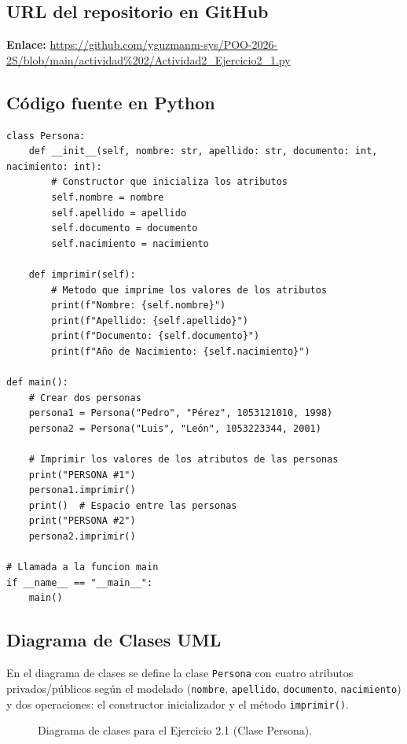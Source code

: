 \documentclass[11pt,a4paper]{article}
\newcommand{\umlm}{$-$\,}
\newcommand{\umlp}{$+$\,}
\begin{document}
\subsection{URL del repositorio en GitHub}
\noindent \textbf{Enlace:} \url{https://github.com/yguzmanm-sys/POO-2026-2S/blob/main/actividad%202/Actividad2_Ejercicio2_1.py}

\subsection{Código fuente en Python}
\begin{lstlisting}[caption={Implementación de la clase Persona (\texttt{Actividad2\_Ejercicio2\_1.py})}]
class Persona:
    def __init__(self, nombre: str, apellido: str, documento: int, nacimiento: int):
        # Constructor que inicializa los atributos
        self.nombre = nombre
        self.apellido = apellido
        self.documento = documento
        self.nacimiento = nacimiento

    def imprimir(self):
        # Metodo que imprime los valores de los atributos
        print(f"Nombre: {self.nombre}")
        print(f"Apellido: {self.apellido}")
        print(f"Documento: {self.documento}")
        print(f"Año de Nacimiento: {self.nacimiento}")

def main():
    # Crear dos personas
    persona1 = Persona("Pedro", "Pérez", 1053121010, 1998)
    persona2 = Persona("Luis", "León", 1053223344, 2001)

    # Imprimir los valores de los atributos de las personas
    print("PERSONA #1")
    persona1.imprimir()
    print()  # Espacio entre las personas
    print("PERSONA #2")
    persona2.imprimir()

# Llamada a la funcion main
if __name__ == "__main__":
    main()
\end{lstlisting}

\subsection{Diagrama de Clases UML}
En el diagrama de clases se define la clase \texttt{Persona} con cuatro atributos privados/públicos según el modelado (\texttt{nombre}, \texttt{apellido}, \texttt{documento}, \texttt{nacimiento}) y dos operaciones: el constructor inicializador y el método \texttt{imprimir()}.

\begin{figure}[H]
    \centering
    \caption{Diagrama de clases para el Ejercicio 2.1 (Clase Persona).}
    \label{fig:uml_ej2_1}
\end{figure}
\end{document}
